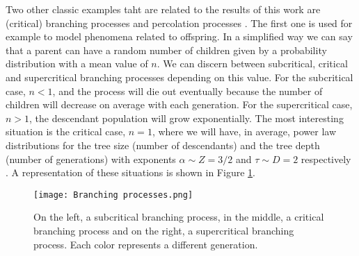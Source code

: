 Two other classic examples taht are related to the results of this work are (critical) branching processes \cite{harris1963theory} and percolation processes \cite{stauffer2018introduction}. 
The first one is used for example to model phenomena 
related to offspring. In a simplified way we can say that a parent can have a random number of children given by a probability distribution with a mean value of $n$. We can discern between
subcritical, critical and supercritical branching processes depending on this value. For the subcritical case, $n<1$, and the process will die out eventually because the number of children
will decrease on average with each generation. For the supercritical case, $n>1$, the descendant population will grow exponentially. The most interesting situation is the critical case, $n=1$, 
where we will have, in average, power law distributions for the tree size (number of descendants) and the tree depth (number of generations) with exponents $\alpha\sim Z=3/2$ and $\tau\sim D=2$ respectively 
\cite{notarmuzi2021percolation}. A representation of these situations is shown in Figure \ref{f:branching_processes}.

\begin{figure}[H]
    \centering
    \texttt{[image: Branching processes.png]}
    \caption{On the left, a subcritical branching process, in the middle, a critical branching process and on the right, a supercritical branching process. Each color represents a different
    generation.}
    \label{f:branching_processes}   
\end{figure}


